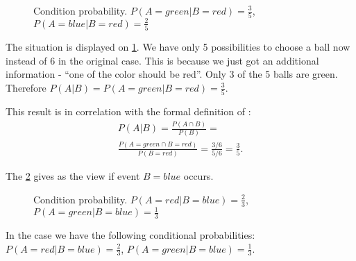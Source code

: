 \begin{example}
\begin{figure}[H]
  \caption{Condition probability. $P(A = green|B = red) =
    \frac{3}{5}$, $P(A = blue| B = red) = \frac{2}{5}$}
  \label{fig:excondprobability_red}
\end{figure}
The situation is displayed on \cref{fig:excondprobability_red}. We have only 5
possibilities to choose a ball now instead of 6 in the original case.
This is because we just got an additional information - ``one of the
color should be red''. Only 3 of the 5 balls are green. Therefore
$P(A|B) = P(A=green|B=red) = \frac{3}{5}$. 

This result is in correlation with the formal definition of
:
\begin{eqnarray}
P(A|B) = \frac{P\left(A \cap B\right)}{P(B)} = 
\nonumber \\
\frac{P\left(A = green \cap B = red\right)}{P(B = red)} = 
\frac{3/6}{5/6} = \frac{3}{5}.
\nonumber
\end{eqnarray}

The \cref{fig:excondprobability_blue} gives as the view if event
$B=blue$ occurs. 
\begin{figure}[H]
  \centering
  \caption{Condition probability. $P(A = red|B=blue) = \frac{2}{3}$,
    $P(A= green|B = blue) = \frac{1}{3}$} 
  \label{fig:excondprobability_blue}
\end{figure}
In the case we have the following conditional probabilities:
$P(A = red|B=blue) = \frac{2}{3}$, $P(A= green|B = blue) =
    \frac{1}{3}$.


\end{example}
